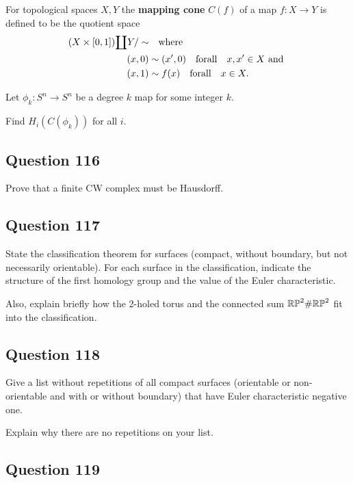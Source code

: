 \documentclass[12pt]{article}
\begin{document}
For topological spaces \(X, Y\) the \textbf{mapping cone} \(C(f )\) of a
map \(f : X \to Y\) is defined to be the quotient space \begin{align*}
(X \times [0, 1]){\coprod} Y / \sim &{\quad \operatorname{where} \quad}  \\ 
(x, 0) &\sim (x', 0) {\quad \operatorname{for all} \quad} x, x' \in X \text{ and } \\ 
(x, 1) &\sim f (x) {\quad \operatorname{for all } \quad} x \in X
.\end{align*}

Let \(\phi_k : S^n \to S^n\) be a degree \(k\) map for some integer
\(k\).

Find \(H_i(C(\phi_k ))\) for all \(i\).

\hypertarget{question-116-2}{%
\subsection{Question 116}\label{question-116-2}}

Prove that a finite CW complex must be Hausdorff.

\hypertarget{question-117-2}{%
\subsection{Question 117}\label{question-117-2}}

State the classification theorem for surfaces (compact, without
boundary, but not necessarily orientable). For each surface in the
classification, indicate the structure of the first homology group and
the value of the Euler characteristic.

Also, explain briefly how the 2-holed torus and the connected sum
\({\mathbb{RP}}^2 \# {\mathbb{RP}}^2\) fit into the classification.

\hypertarget{question-118-2}{%
\subsection{Question 118}\label{question-118-2}}

Give a list without repetitions of all compact surfaces (orientable or
non-orientable and with or without boundary) that have Euler
characteristic negative one.

Explain why there are no repetitions on your list.

\hypertarget{question-119-2}{%
\subsection{Question 119}\label{question-119-2}}
\end{document}
